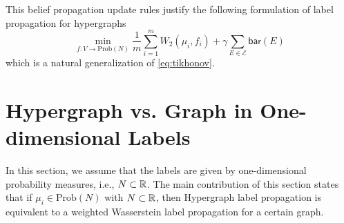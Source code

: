 \documentclass[letterpaper]{article} %
\begin{document}
This belief propagation update rules justify the following formulation of label propagation for hypergraphs
\begin{equation}\label{eq:tikhonoc_Hyper}
    \min_{f:V\to \mathrm{Prob}(N)} \frac{1}{m}\sum_{i=1}^m W_2(\mu_i, f_i) + \gamma\sum_{E\in \mathcal E}\mathsf{bar}(E)
\end{equation}
which is a natural generalization of \eqref{eq:tikhonov}.

\section{Hypergraph vs. Graph in  One-dimensional Labels}
In this section, we assume that the labels are given by one-dimensional probability measures, i.e., $N\subset \mathbb{R}$. The main contribution of this section states that if $\mu_i\in \mathrm{Prob}(N)$ with $N\subset \mathbb{R}$, then Hypergraph label propagation is equivalent to a weighted  Wasserstein label propagation for a certain graph. 
\end{document}
